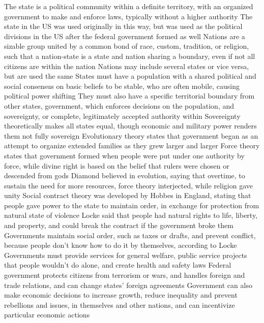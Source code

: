 \documentclass[11 pt, twoside]{article}
\newenvironment{outline*}
{
	\begin{outline}[enumerate]
	}
	{\end{outline}
}
\begin{document}
\begin{outline*}
\1 The state is a political community within a definite territory, with an organized government to make and enforce laws, typically without a higher authority
\2 The state in the US was used originally in this way, but was used as the political divisions in the US after the federal government formed as well
\2 Nations are a sizable group united by a common bond of race, custom, tradition, or religion, such that a nation-state is a state and nation sharing a boundary, even if not all citizens are within the nation
\2 Nations may include several states or vice versa, but are used the same
\1 States must have a population with a shared political and social consensus on basic beliefs to be stable, who are often mobile, causing political power shifting
\2 They must also have a specific territorial boundary from other states, government, which enforces decisions on the population, and sovereignty, or complete, legitimately accepted authority within
\2 Sovereignty theoretically makes all states equal, though economic and military power renders them not fully sovereign
\1 Evolutionary theory states that government began as an attempt to organize extended families as they grew larger and larger
\2 Force theory states that government formed when people were put under one authority by force, while divine right is based on the belief that rulers were chosen or descended from gods
\2 Diamond believed in evolution, saying that overtime, to sustain the need for more resources, force theory interjected, while religion gave unity
\2 Social contract theory was developed by Hobbes in England, stating that people gave power to the state to maintain order, in exchange for protection from natural state of violence
\2 Locke said that people had natural rights to life, liberty, and property, and could break the contract if the government broke them
\1 Governments maintain social order, such as taxes or drafts, and prevent conflict, because people don’t know how to do it by themselves, according to Locke
\2 Governments must provide services for general welfare, public service projects that people wouldn’t do alone, and create health and safety laws
\2 Federal government protects citizens from terrorism or wars, and handles foreign and trade relations, and can change states' foreign agreements
\2 Government can also make economic decisions to increase growth, reduce inequality and prevent rebellions and issues, in themselves and other nations, and can incentivize particular economic actions
\end{outline*}
\end{document}

